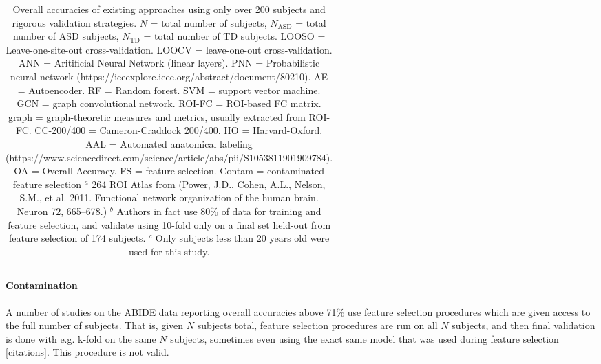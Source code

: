 \documentclass[10pt]{article}
\begin{document}
\begin{table}
\begin{tabular}{lcccccrrrcc}
    \bottomrule
  \end{tabular} \label{tab:existing-attempts}
  \caption{
    Overall accuracies of existing approaches using only over 200 subjects and rigorous validation strategies. \(N\) = total number of subjects, \(N_{\text{ASD}}\)
    = total number of ASD subjects, \(N_{\text{TD}}\) = total number of TD subjects. LOOSO =
    Leave-one-site-out cross-validation. LOOCV = leave-one-out cross-validation. ANN = Aritificial
    Neural Network (linear layers). PNN = Probabilistic neural network (https://ieeexplore.ieee.org/abstract/document/80210). AE = Autoencoder. RF = Random forest. SVM = support vector
    machine. GCN = graph convolutional network. ROI-FC = ROI-based FC matrix. graph = graph-theoretic
  measures and metrics, usually extracted from ROI-FC. CC-200/400 = Cameron-Craddock 200/400. HO =
  Harvard-Oxford. AAL = Automated anatomical labeling
  (https://www.sciencedirect.com/science/article/abs/pii/S1053811901909784). OA = Overall Accuracy.
  FS = feature selection. Contam = contaminated feature selection
    \hspace{\textwidth} \(^a\) 264 ROI Atlas from (Power, J.D., Cohen, A.L., Nelson, S.M., et al.
    2011. Functional network organization of the human brain. Neuron 72, 665–678.)
    \hspace{\textwidth} \(^b\) Authors in fact use 80\% of data for training and feature selection,
    and validate using 10-fold only on a final set held-out from feature selection of 174 subjects.
    \hspace{\textwidth} \(^c\) Only subjects less than 20 years old were used for this study.
  }
  \normalsize
\end{table}

\paragraph{Contamination}

A number of studies on the ABIDE data reporting overall accuracies above 71\% use feature selection procedures which are
given access to the full number of subjects. That is, given \(N\) subjects total, feature selection procedures are run
on all \(N\) subjects, and then final validation is done with e.g. k-fold on the same \(N\) subjects, sometimes even using
the exact same model that was used during feature selection [citations]. This procedure is not valid.
\end{document}
